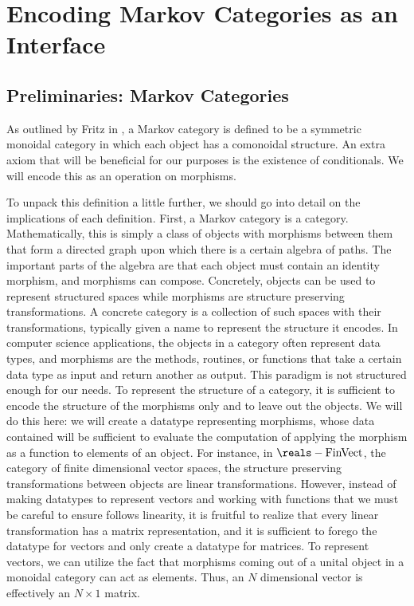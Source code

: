 \section{Encoding Markov Categories as an Interface}
\subsection{Preliminaries: Markov Categories}
As outlined by Fritz in \cite{fritz}, a Markov category is defined to be a symmetric monoidal category in which each object has a comonoidal structure.
An extra axiom that will be beneficial for our purposes is the existence of conditionals.
We will encode this as an operation on morphisms.

To unpack this definition a little further, we should go into detail on the implications of each definition.
First, a Markov category is a category.
Mathematically, this is simply a class of objects with morphisms between them that form a directed graph upon which there is a certain algebra of paths.
The important parts of the algebra are that each object must contain an identity morphism, and morphisms can compose.
Concretely, objects can be used to represent structured spaces while morphisms are structure preserving transformations.
A concrete category is a collection of such spaces with their transformations, typically given a name to represent the structure it encodes.
In computer science applications, the objects in a category often represent data types, and morphisms are the methods, routines, or functions that take a certain data type as input and return another as output.
This paradigm is not structured enough for our needs.
To represent the structure of a category, it is sufficient to encode the structure of the morphisms only and to leave out the objects.
We will do this here: we will create a datatype representing morphisms, whose data contained will be sufficient to evaluate the computation of applying the morphism as a function to elements of an object.
For instance, in $\reals-\mathrm{FinVect}$, the category of finite dimensional vector spaces, the structure preserving transformations between objects are linear transformations.
However, instead of making datatypes to represent vectors and working with functions that we must be careful to ensure follows linearity, it is fruitful to realize that every linear transformation has a matrix representation, and it is sufficient to forego the datatype for vectors and only create a datatype for matrices.
To represent vectors, we can utilize the fact that morphisms coming out of a unital object in a monoidal category can act as elements.
Thus, an $N$ dimensional vector is effectively an $N\times 1$ matrix.

